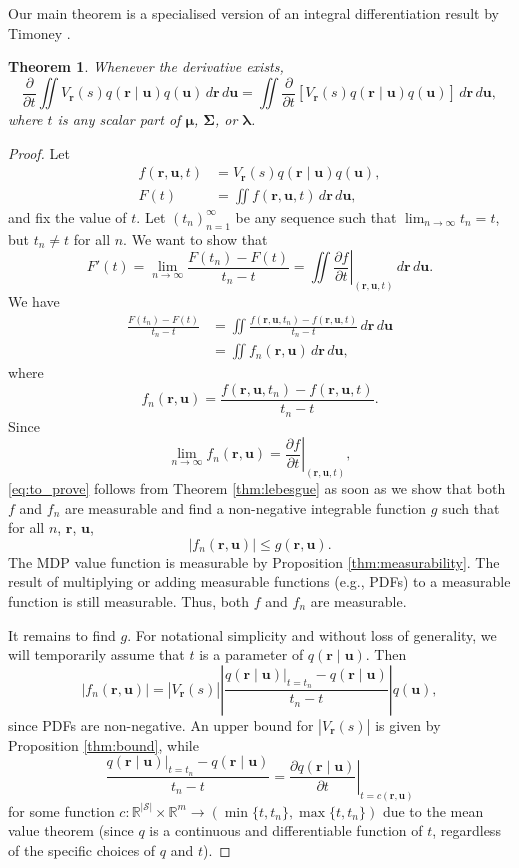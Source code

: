 \documentclass{mpaper}
\newtheorem{theorem}{Theorem}[section]
\newcommand{\V}{V_{\mathbf{r}}}
\newcommand{\dx}{\,d\mathbf{r}\,d\mathbf{u}}
\newcommand{\f}{f(\mathbf{r}, \mathbf{u}, t)}
\newcommand{\fn}{f_n(\mathbf{r}, \mathbf{u})}
\newcommand{\ftn}{f(\mathbf{r}, \mathbf{u}, t_n)}
\newcommand{\g}{g(\mathbf{r}, \mathbf{u})}
\newcommand{\dt}{\frac{\partial}{\partial t}}
\newcommand{\df}{\left.\frac{\partial f}{\partial t}\right|_{(\mathbf{r},
    \mathbf{u}, t)}}
\begin{document}
Our main theorem is a specialised version of an integral differentiation result
by Timoney \cite{lecture_notes}.
\begin{theorem} \label{thm:main}
  Whenever the derivative exists,
  \[
    \dt\iint
    \V(s)q(\mathbf{r} \mid \mathbf{u})q(\mathbf{u})\dx
    = \iint
    \dt[\V(s)q(\mathbf{r} \mid \mathbf{u})q(\mathbf{u})]\dx,
  \]
  where $t$ is any scalar part of $\bm\mu$, $\bm\Sigma$, or $\bm\lambda$.
\end{theorem}
\begin{proof}
  Let
  \begin{align*}
    \f &= \V(s)q(\mathbf{r} \mid \mathbf{u})q(\mathbf{u}), \\
    F(t) &= \iint \f\dx,
  \end{align*}
  and fix the value of $t$. Let $(t_n)_{n=1}^\infty$ be any sequence such that
  $\lim_{n \to \infty} t_n = t$, but $t_n \ne t$ for all $n$. We want to show
  that
  \begin{equation} \label{eq:to_prove}
    F'(t) = \lim_{n \to \infty} \frac{F(t_n) - F(t)}{t_n - t} = \iint \df\dx.
  \end{equation}
  We have
  \[
    \begin{split}
      \frac{F(t_n) - F(t)}{t_n - t} &= \iint \frac{\ftn - \f}{t_n - t}\dx \\
      &= \iint \fn\dx,
    \end{split}
  \]
  where
  \[
    \fn = \frac{\ftn - \f}{t_n - t}.
  \]
  Since
  \[
    \lim_{n \to \infty} \fn = \df,
  \]
  \eqref{eq:to_prove} follows from Theorem \ref{thm:lebesgue} as soon as we show
  that both $f$ and $f_n$ are measurable and find a non-negative integrable
  function $g$ such that for all $n$, $\mathbf{r}$, $\mathbf{u}$,
  \[
    |\fn| \le \g.
  \]
  The MDP value function is measurable by Proposition \ref{thm:measurability}.
  The result of multiplying or adding measurable functions (e.g., PDFs) to a
  measurable function is still measurable. Thus, both $f$ and $f_n$ are
  measurable.

  It remains to find $g$. For notational simplicity and without loss of
  generality, we will temporarily assume that $t$ is a parameter of
  $q(\mathbf{r} \mid \mathbf{u})$. Then
  \[
    |\fn| = |\V(s)| \left| \frac{q(\mathbf{r} \mid \mathbf{u})|_{t =
          t_n} - q(\mathbf{r} \mid \mathbf{u})}{t_n - t} \right| q(\mathbf{u}),
  \]
  since PDFs are non-negative. An upper bound for
  $|\V(s)|$ is given by Proposition \ref{thm:bound}, while
  \[
    \frac{q(\mathbf{r} \mid \mathbf{u})|_{t = t_n} - q(\mathbf{r} \mid \mathbf{u})}{t_n - t} = \left.
      \frac{\partial q(\mathbf{r} \mid \mathbf{u})}{\partial t} \right|_{t = c(\mathbf{r},
      \mathbf{u})}
  \]
  for some function $c : \mathbb{R}^{|\mathcal{S}|} \times \mathbb{R}^m \to
  (\min\{t, t_n\}, \max\{t, t_n\})$ due to the mean value theorem (since $q$ is
  a continuous and differentiable function of $t$, regardless of the specific
  choices of $q$ and $t$).


\end{proof}
\end{document}
